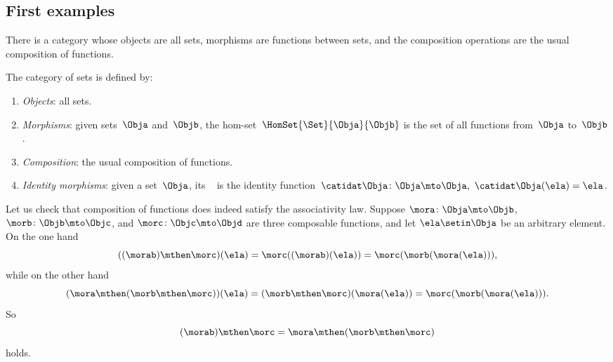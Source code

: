 \subsection{First examples}

\begin{example}
    \label{exa:the-category-of-sets}
    There is a category whose objects are all sets, morphisms are functions between sets, and the composition operations are the usual composition of functions.
    
    \begin{ctdefinition}
    \label{def:Set}
    The category \Set of sets is defined by:
    \begin{enumerate}
        \item \emph{Objects}: all sets.
        \item \emph{Morphisms}: given sets~$\Obja$ and~$\Objb$, the hom-set~$\HomSet{\Set}{\Obja}{\Objb}$ is the set of all functions from~$\Obja$ to~$\Objb$.
        \item \emph{Composition}: the usual composition of functions.
        \item \emph{Identity morphisms}: given a set~$\Obja$, its ~ is the identity function~$\catidat\Obja \colon \Obja \mto \Obja, \ \catidat\Obja(\ela) = \ela$.
    \end{enumerate}
\end{ctdefinition}

 Let us check that composition of functions does indeed satisfy the associativity law.
    Suppose $\mora \colon \Obja \mto \Objb$, $\morb\colon \Objb \mto \Objc$, and $\morc \colon \Objc \mto \Objd$ are three composable functions, and let $\ela \setin \Obja$ be an arbitrary element.
    On the one hand
    \begin{equation}\label{eq:function-associativity-1}
        ((\morab) \mthen \morc)(\ela) = \morc((\morab)(\ela)) = \morc (\morb (\mora (\ela))),
    \end{equation}
    while on the other hand
    \begin{equation}\label{eq:function-associativity-2}
        (\mora \mthen (\morb \mthen \morc))(\ela)
        = (\morb \mthen \morc)(\mora(\ela)) = \morc (\morb (\mora (\ela))).
    \end{equation}
    So
    \begin{equation}\label{eq:function-associativity-3}
        (\morab)
        \mthen \morc = \mora \mthen (\morb \mthen \morc)
    \end{equation}
    holds.
    

\end{example}
